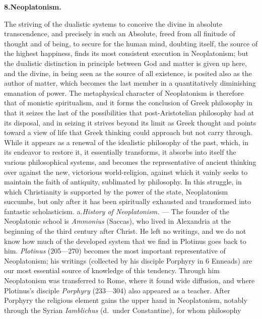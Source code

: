 \begin{center}
\textbf{8.\enspace Neoplatonism.}
\end{center}

The striving of the dualistic systems to conceive the divine in
absolute transcendence, and precisely in such an Absolute,
freed from all finitude of thought and of being, to secure
for the human mind, doubting itself, the source of the highest
happiness, finds its most consistent execution in Neoplatonism; but the
dualistic distinction in principle between God and matter is given up
here, and the divine, in being seen as the source of all existence, is
posited also as the author of matter, which becomes the last member in
a quantitatively diminishing emanation of power. The metaphysical
character of Neoplatonism is therefore that of monistic spiritualism,
and it forms the conclusion of Greek philosophy in that it seizes the
last of the possibilities that post-Aristotelian philosophy had at its
disposal, and in seizing it strives beyond its limit as Greek thought
and points toward a view of life that Greek thinking could approach but
not carry through. While it appears as a renewal of the idealistic
philosophy of the past, which, in its endeavor to restore it, it
essentially transforms, it absorbs into itself the various
philosophical systems, and becomes the representative of ancient
thinking over against the new, victorious world-religion, against which
it vainly seeks to maintain the faith of antiquity, sublimated by
philosophy. In this struggle, in which Christianity is supported by the
power of the state, Neoplatonism succumbs, but only after it has been
spiritually exhausted and transformed into fantastic scholasticism.
a.\enspace \emph{History of Neoplatonism.} --- The founder of the
Neoplatonic school is \emph{Ammonius} (Saccas), who lived in Alexandria
at the beginning of the third century after Christ. He left no
writings, and we do not know how much of the developed system that we
find in Plotinus goes back to him. \emph{Plotinus} (205---270) becomes
the most important representative of Neoplatonism; his writings
(collected by his disciple Porphyry in 6 Enneads) are our most
essential source of knowledge of this tendency. Through him
Neoplatonism was transferred to Rome, where it found wide diffusion, and
where Plotinus's disciple \emph{Porphyry} (233---304) also appeared as
a teacher. After Porphyry the religious element gains the
upper hand in Neoplatonism, notably through the Syrian
\emph{Iamblichus} (d.\ under Constantine), for whom philosophy
